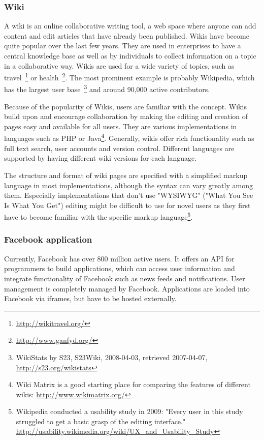 \subsubsection{Wiki}
A wiki is an online collaborative writing tool, a web space where anyone can add content and edit articles that have already been published\cite{wiki_collaboration}. Wikis have become quite popular over the last few years. They are used in enterprises to have a central knowledge base as well as by individuals to collect information on a topic in a collaborative way. Wikis are used for a wide variety of topics, such as travel~\footnote{\url{http://wikitravel.org/}} or health~\footnote{\url{http://www.ganfyd.org/}}. The most prominent example is probably Wikipedia, which has the largest user base~\footnote{WikiStats by S23, S23Wiki, 2008-04-03, retrieved 2007-04-07, \url{http://s23.org/wikistats}} and around 90,000 active contributors.

Because of the popularity of Wikis, users are familiar with the concept. Wikis build upon and encourage collaboration by making the editing and creation of pages easy and available for all users. They are various implementations in languages such as PHP or Java\footnote{Wiki Matrix is a good starting place for comparing the features of different wikis: \url{http://www.wikimatrix.org/}}. Generally, wikis offer rich functionality such as full text search, user accounts and version control. Different languages are supported by having different wiki versions for each language.  

The structure and format of wiki pages are specified with a simplified markup language in most implementations, although the syntax can vary greatly among them. Especially implementations that don't use "WYSIWYG" ("What You See Is What You Get") editing might be difficult to use for novel users as they first have to become familiar with the specific markup language\footnote{Wikipedia conducted a usability study in 2009: "Every user in this study struggled to get a basic grasp of the editing interface." \url{http://usability.wikimedia.org/wiki/UX_and_Usability_Study}}\cite{wikis_collaboration}.


\subsubsection{Facebook application}
Currently, Facebook has over 800 million active users. It offers an API for programmers to build applications, which can access user information and integrate functionality of Facebook such as news feeds and notifications. User management is completely managed by Facebook. Applications are loaded into Facebook via iframes, but have to be hosted externally.

